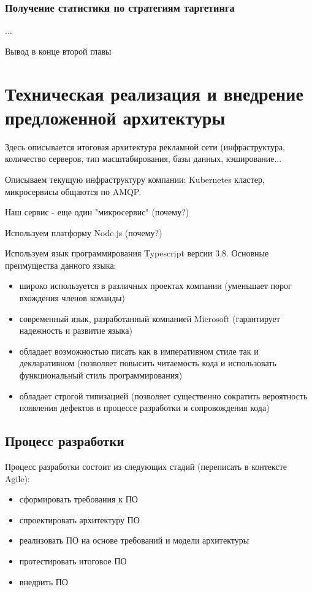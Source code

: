 \documentclass[times]{itmo-student-thesis}
\begin{document}
\subsection{Получение статистики по стратегиям таргетинга}
...

\chapterconclusion

Вывод в конце второй главы






\chapter{Техническая реализация и внедрение предложенной архитектуры}

Здесь описывается итоговая архитектура рекламной сети (инфраструктура, количество серверов, тип масштабирования, базы данных, кэширование...

Описываем текущую инфраструктуру компании: Kubernetes кластер, микросервисы общаются по AMQP.

Наш сервис -  еще один "микросервис" (почему?)

Используем платформу Node.js (почему?)

Используем язык программирования Typescript \cite{typescript-lang} версии 3.8. Основные преимущества данного языка:
\begin{itemize}
\item широко используется в различных проектах компании (уменьшает порог вхождения членов команды)
\item современный язык, разработанный компанией Microsoft (гарантирует надежность и развитие языка)
\item обладает возможностью писать как в императивном стиле так и декларативном (позволяет повысить читаемость кода и использовать функциональный стиль программирования)
\item обладает строгой типизацией (позволяет существенно сократить вероятность появления дефектов в процессе разработки и сопровождения кода)
\end{itemize}


\section{Процесс разработки}

Процесс разработки состоит из следующих стадий (переписать в контексте Agile):
\begin{itemize}
	\item сформировать требования к ПО
	\item спроектировать архитектуру ПО
	\item реализовать ПО на основе требований и модели архитектуры
	\item протестировать итоговое ПО
	\item внедрить ПО
\end{itemize}
\end{document}
